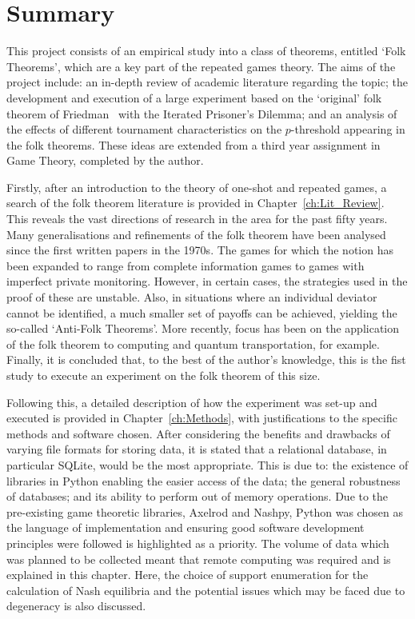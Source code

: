 \chapter{Summary}

This project consists of an empirical study into a class of theorems, entitled
`Folk Theorems', which are a key part of the repeated games theory. The aims of
the project include: an in-depth review of academic literature regarding the
topic; the development and execution of a large experiment based on the
`original' folk theorem of Friedman~\cite{Friedman1971} with the Iterated
Prisoner's Dilemma; and an analysis of the effects of different tournament
characteristics on the \(p\)-threshold appearing in the folk theorems. These
ideas are extended from a third year assignment in Game Theory, completed by the
author.

Firstly, after an introduction to the theory of one-shot and repeated games, a
search of the folk theorem literature is provided in Chapter~\ref{ch:Lit_Review}. This reveals the vast
directions of research in the area for the past fifty years. Many
generalisations and refinements of the folk theorem have been analysed since the
first written papers in the 1970s. The games for which the notion has been
expanded to range from complete information games to games with imperfect
private monitoring. However, in certain cases, the strategies used in the proof
of these are unstable. Also, in situations where an individual deviator cannot
be identified, a much smaller set of payoffs can be achieved, yielding the
so-called `Anti-Folk Theorems'. More recently, focus has been on the application
of the folk theorem to computing and quantum transportation, for example.
Finally, it is concluded that, to the best of the author's knowledge, this is
the fist study to execute an experiment on the folk theorem of this size.

Following this, a detailed description of how the experiment was set-up and
executed is provided in Chapter~\ref{ch:Methods}, with justifications to the specific methods and software
chosen. After considering the benefits and drawbacks of varying file formats for
storing data, it is stated that a relational database, in particular SQLite,
would be the most appropriate. This is due to: the existence of libraries in
Python enabling the easier access of the data; the general robustness of
databases; and its ability to perform out of memory operations. Due to the
pre-existing game theoretic libraries, Axelrod and Nashpy, Python was chosen as
the language of implementation and ensuring good software development principles
were followed is highlighted as a priority. The volume of data which was planned
to be collected meant that remote computing was required and is explained in
this chapter. Here, the choice of support enumeration for the calculation of
Nash equilibria and the potential issues which may be faced due to degeneracy is
also discussed.

